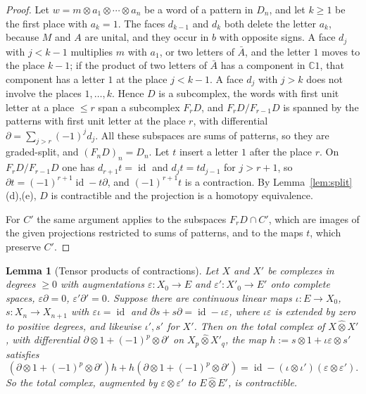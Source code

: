 \documentclass[11pt]{amsart}
\newtheorem{lemma}[theorem]{Lemma}
\theoremstyle{definition}
\theoremstyle{remark}
\newcommand{\C}{\mathbb C}
\newcommand{\id}{\operatorname{id}}
\begin{document}
\begin{proof}
Let $w=m\otimes a_1\otimes\cdots\otimes a_n$ be a word of a pattern in $D_n$,
and let $k\ge1$ be the first place with $a_k=1$.  The faces $d_{k-1}$ and $d_k$
both delete the letter $a_k$, because $M$ and $A$ are unital, and they occur in
$b$ with opposite signs.  A face $d_j$ with $j<k-1$ multiplies $m$ with $a_1$,
or two letters of $\bar A$, and the letter $1$ moves to the place $k-1$; if the
product of two letters of $\bar A$ has a component in $\C1$, that component has
a letter $1$ at the place $j<k-1$.  A face $d_j$ with $j>k$ does not involve
the places $1,\dots,k$.  Hence $D$ is a subcomplex, the words with first unit
letter at a place $\le r$ span a subcomplex $F_rD$, and $F_rD/F_{r-1}D$ is
spanned by the patterns with first unit letter at the place $r$, with
differential $\partial=\sum_{j>r}(-1)^{j}d_j$.  All these subspaces are sums of
patterns, so they are graded-split, and $(F_nD)_n=D_n$.  Let $t$ insert a
letter $1$ after the place $r$.  On $F_rD/F_{r-1}D$ one has $d_{r+1}t=\id$ and
$d_jt=td_{j-1}$ for $j>r+1$, so $\partial t=(-1)^{r+1}\id-t\partial$, and
$(-1)^{r+1}t$ is a contraction.  By Lemma~\ref{lem:split}(d),(e), $D$ is
contractible and the projection is a homotopy equivalence.

For $C'$ the same argument applies to the subspaces $F_rD\cap C'$, which are
images of the given projections restricted to sums of patterns, and to the
maps $t$, which preserve $C'$.
\end{proof}

\begin{lemma}[Tensor products of contractions]\label{lem:tensor}
Let $X$ and $X'$ be complexes in degrees $\ge0$ with augmentations
$\varepsilon:X_0\to E$ and $\varepsilon':X'_0\to E'$ onto complete spaces,
$\varepsilon\partial=0$, $\varepsilon'\partial'=0$.  Suppose there are
continuous linear maps $\iota:E\to X_0$, $s:X_n\to X_{n+1}$ with
$\varepsilon\iota=\id$ and $\partial s+s\partial=\id-\iota\varepsilon$, where
$\iota\varepsilon$ is extended by zero to positive degrees, and likewise
$\iota',s'$ for $X'$.  Then on the total complex of $X\widehat\otimes X'$, with
differential $\partial\otimes1+(-1)^{p}\otimes\partial'$ on $X_p\widehat\otimes
X'_q$, the map $h:=s\otimes1+\iota\varepsilon\otimes s'$ satisfies
\[
(\partial\otimes1+(-1)^{p}\otimes\partial')h+h(\partial\otimes1+(-1)^{p}\otimes\partial')
=\id-(\iota\otimes\iota')(\varepsilon\otimes\varepsilon').
\]
So the total complex, augmented by $\varepsilon\otimes\varepsilon'$ to
$E\widehat\otimes E'$, is contractible.
\end{lemma}
\end{document}
